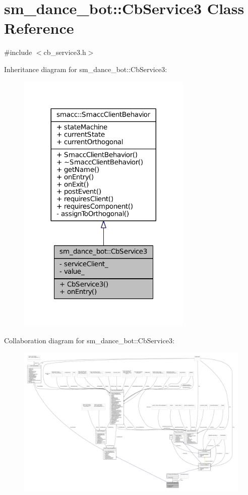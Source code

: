 \hypertarget{classsm__dance__bot_1_1CbService3}{}\section{sm\+\_\+dance\+\_\+bot\+:\+:Cb\+Service3 Class Reference}
\label{classsm__dance__bot_1_1CbService3}


{\ttfamily \#include $<$cb\+\_\+service3.\+h$>$}



Inheritance diagram for sm\+\_\+dance\+\_\+bot\+:\+:Cb\+Service3\+:
\nopagebreak
\begin{figure}[H]
\begin{center}
\leavevmode
\includegraphics[width=236pt]{classsm__dance__bot_1_1CbService3__inherit__graph}
\end{center}
\end{figure}


Collaboration diagram for sm\+\_\+dance\+\_\+bot\+:\+:Cb\+Service3\+:
\nopagebreak
\begin{figure}[H]
\begin{center}
\leavevmode
\includegraphics[width=350pt]{classsm__dance__bot_1_1CbService3__coll__graph}
\end{center}
\end{figure}
